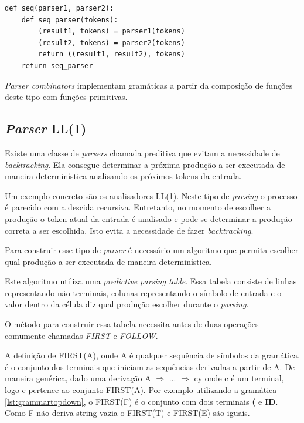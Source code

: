 \begin{lstlisting}[caption=Exemplo de combinador em pseudo-python,label={lst:seqcomb}]
def seq(parser1, parser2):
    def seq_parser(tokens):
        (result1, tokens) = parser1(tokens)
        (result2, tokens) = parser2(tokens)
        return ((result1, result2), tokens)
    return seq_parser
\end{lstlisting}

\textit{Parser combinators} implementam gramáticas a partir da composição de funções deste tipo
com funções primitivas.

\subsection{\textit{Parser} LL(1)}

Existe uma classe de \textit{parsers} chamada preditiva que evitam a necessidade de \textit{backtracking}. 
Ela consegue determinar a próxima produção a ser executada de maneira determinística 
analisando os próximos tokens da entrada.

Um exemplo concreto são os analisadores LL(1). Neste tipo de \textit{parsing} 
o processo é parecido com a descida recursiva. Entretanto, no momento de escolher 
a produção o token atual da entrada é analisado e pode-se determinar 
a produção correta a ser escolhida. Isto evita a necessidade de fazer \textit{backtracking}.

Para construir esse tipo de \textit{parser} é necessário um algoritmo 
que permita escolher qual produção a ser executada de maneira determinística.

Este algoritmo utiliza uma \textit{predictive parsing table}. Essa tabela consiste
de linhas representando não terminais, colunas representando o símbolo de entrada e o valor
dentro da célula diz qual produção escolher durante o \textit{parsing}. 

O método para construir essa tabela necessita antes de duas operações comumente chamadas \textit{FIRST} e 
\textit{FOLLOW}.

A definição de FIRST(A), onde A é qualquer sequência de símbolos da gramática, 
é o conjunto dos terminais que iniciam as 
sequências derivadas a partir de A. 
De maneira genérica, dado uma derivação A $\Rightarrow$ ... $\Rightarrow$ cy onde c é um terminal, logo
c pertence ao conjunto FIRST(A).
Por exemplo utilizando a gramática \ref{lst:grammartopdown}, o FIRST(F) é o conjunto com
dois terminais \textbf{(} e \textbf{ID}. Como F não deriva string vazia o FIRST(T) e FIRST(E) são iguais.

